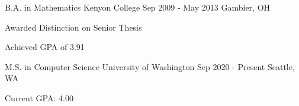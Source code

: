 
\vspace{-3mm}

\begin{minipage}[t]{.49\textwidth}
\begin{cventries}
  \cventry
  {B.A. in Mathematics}
    {Kenyon College}
    {Sep 2009 - May 2013}
    {Gambier, OH}
    {
      \begin{cvitems}
        \item {Awarded Distinction on Senior Thesis}
        \item {Achieved GPA of 3.91}
      \end{cvitems}
    }
\end{cventries}
\end{minipage}
\hspace{.02\textwidth}
\begin{minipage}[t]{.49\textwidth}
\begin{cventries}
  \cventry
  {M.S. in Computer Science}
    {University of Washington}
    {Sep 2020 - Present}
    {Seattle, WA}
    {
      \begin{cvitems}
        \item {Current GPA: 4.00}
      \end{cvitems}
    }
\end{cventries}

\end{minipage}

